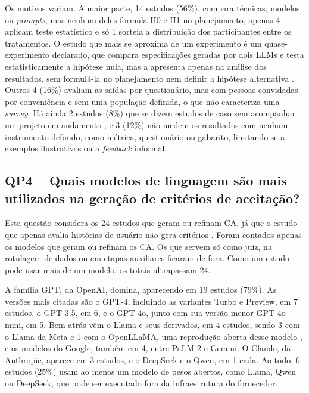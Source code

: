 Os motivos variam. A maior parte, 14 estudos (56\%), compara técnicas, modelos ou \textit{prompts}, mas nenhum deles formula H0 e H1 no planejamento, apenas 4 aplicam teste estatístico e só 1 sorteia a distribuição dos participantes entre os tratamentos. O estudo que mais se aproxima de um experimento é um quase-experimento declarado, que compara especificações geradas por dois LLMs e testa estatisticamente a hipótese nula, mas a apresenta apenas na análise dos resultados, sem formulá-la no planejamento nem definir a hipótese alternativa \cite{hassani2026}. Outros 4 (16\%) avaliam as saídas por questionário, mas com pessoas convidadas por conveniência e sem uma população definida, o que não caracteriza uma \textit{survey}. Há ainda 2 estudos (8\%) que se dizem estudos de caso sem acompanhar um projeto em andamento \cite{wang2025,zyberaj2026}, e 3 (12\%) não medem os resultados com nenhum instrumento definido, como métrica, questionário ou gabarito, limitando-se a exemplos ilustrativos ou a \textit{feedback} informal.

\subsection{QP4 -- Quais modelos de linguagem são mais utilizados na geração de critérios de aceitação?}
\label{sec:qp4}

Esta questão considera os 24 estudos que geram ou refinam CA, já que o estudo que apenas avalia histórias de usuário não gera critérios \cite{ma2026}. Foram contados apenas os modelos que geram ou refinam os CA. Os que servem só como juiz, na rotulagem de dados ou em etapas auxiliares ficaram de fora. Como um estudo pode usar mais de um modelo, os totais ultrapassam 24.

A família GPT, da OpenAI, domina, aparecendo em 19 estudos (79\%). As versões mais citadas são o GPT-4, incluindo as variantes Turbo e Preview, em 7 estudos, o GPT-3.5, em 6, e o GPT-4o, junto com sua versão menor GPT-4o-mini, em 5. Bem atrás vêm o Llama e seus derivados, em 4 estudos, sendo 3 com o Llama da Meta e 1 com o OpenLLaMA, uma reprodução aberta desse modelo \cite{li2024}, e os modelos do Google, também em 4, entre PaLM-2 e Gemini. O Claude, da Anthropic, aparece em 3 estudos, e o DeepSeek e o Qwen, em 1 cada. Ao todo, 6 estudos (25\%) usam ao menos um modelo de pesos abertos, como Llama, Qwen ou DeepSeek, que pode ser executado fora da infraestrutura do fornecedor.

